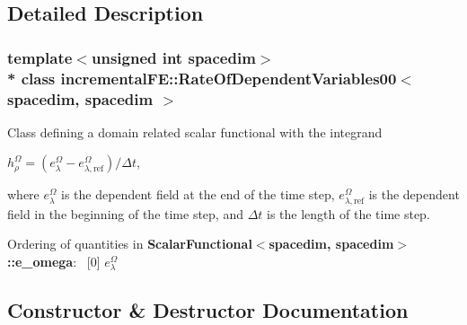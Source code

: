 \subsection{Detailed Description}
\subsubsection*{template$<$unsigned int spacedim$>$\\*
class incremental\+F\+E\+::\+Rate\+Of\+Dependent\+Variables00$<$ spacedim, spacedim $>$}

Class defining a domain related scalar functional with the integrand

$h^\Omega_\rho = (e^\Omega_\lambda-e^\Omega_{\lambda,\mathrm{ref}})/\Delta t$,

where $e^\Omega_\lambda$ is the dependent field at the end of the time step, $e^\Omega_{\lambda,\mathrm{ref}}$ is the dependent field in the beginning of the time step, and $\Delta t$ is the length of the time step.

Ordering of quantities in {\bf Scalar\+Functional$<$spacedim, spacedim$>$\+::e\+\_\+omega}\+:~\newline
 \mbox{[}0\mbox{]} $e^\Omega_\lambda$ 

\subsection{Constructor \& Destructor Documentation}
